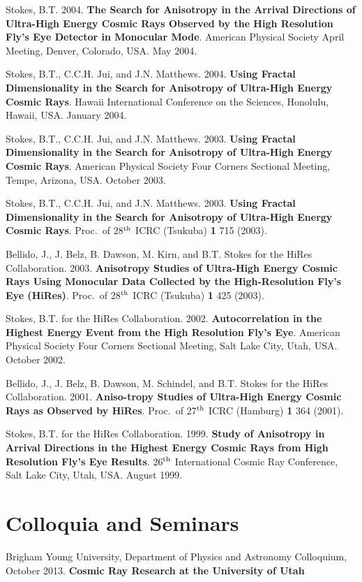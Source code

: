 \begin{resume}
Stokes, B.T.  2004.  {\bf The Search for Anisotropy in the Arrival
Directions of Ultra-High Energy Cosmic Rays Observed by the High Resolution
Fly's Eye Detector in Monocular Mode}.
American Physical Society April Meeting, Denver, Colorado, USA.
May 2004.

Stokes, B.T., C.C.H. Jui, and J.N. Matthews.  2004.  {\bf Using Fractal
Dimensionality in the Search for Anisotropy of Ultra-High Energy Cosmic Rays}.
Hawaii International Conference on the Sciences, Honolulu, Hawaii, USA.
January 2004.

Stokes, B.T., C.C.H. Jui, and J.N. Matthews.  2003.  {\bf Using Fractal
Dimensionality in the Search for Anisotropy of Ultra-High Energy Cosmic Rays}.
American Physical Society Four Corners Sectional Meeting, Tempe, Arizona, USA.
October 2003.

Stokes, B.T., C.C.H. Jui, and J.N. Matthews.  2003.  {\bf Using Fractal
Dimensionality in the Search for Anisotropy of Ultra-High Energy Cosmic Rays}.
Proc.\ of 28$^{\rm th}$ ICRC (Tsukuba) {\bf 1} 715 (2003).

Bellido, J., J. Belz, B. Dawson, M. Kirn, and  B.T. Stokes for the HiRes
Collaboration.  2003.  {\bf Anisotropy Studies of Ultra-High Energy Cosmic
Rays Using Monocular Data Collected by the High-Resolution Fly's Eye (HiRes)}.
 Proc.\ of 28$^{\rm th}$ ICRC (Tsukuba) {\bf 1} 425 (2003).

Stokes, B.T. for the HiRes Collaboration.  2002.  {\bf Autocorrelation in the
Highest Energy Event from the High Resolution Fly's Eye}.  American Physical
Society Four Corners Sectional Meeting, Salt Lake City, Utah, USA.  October
2002.

Bellido, J., J. Belz, B. Dawson, M. Schindel, and B.T. Stokes for the HiRes
Collaboration.  2001.  {\bf Aniso-tropy Studies of Ultra-High Energy Cosmic
Rays as Observed by HiRes}.  Proc.\ of 27$^{\rm th}$ ICRC (Hamburg) {\bf 1} 364
(2001).

Stokes, B.T. for the HiRes Collaboration.  1999.   {\bf Study of Anisotropy in
Arrival Directions in the Highest Energy Cosmic Rays from High Resolution Fly's
Eye Results}.  26$^{\rm th}$ International Cosmic Ray Conference, Salt Lake
City, Utah, USA. August 1999.

\section{\sc Colloquia and Seminars}

Brigham Young University, Department of Physics and Astronomy Colloquium,
October 2013. {\bf Cosmic Ray Research at the University of Utah}


\end{resume}
